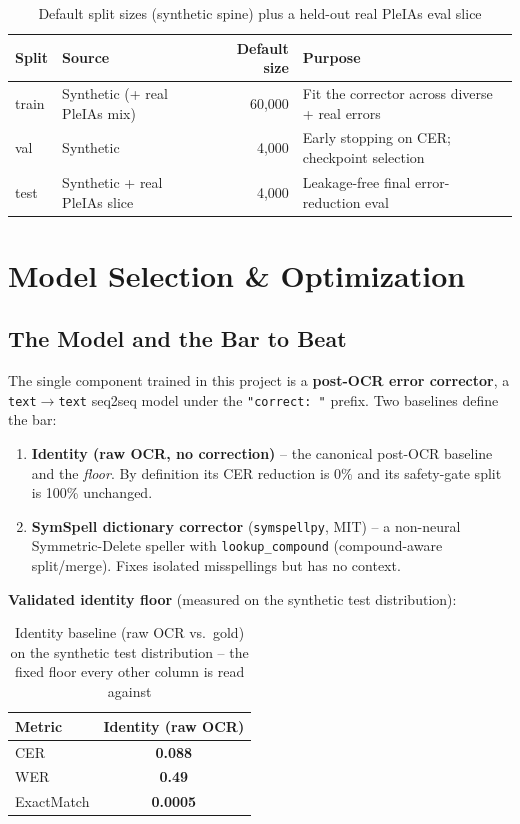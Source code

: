 \documentclass[12pt,a4paper]{article}
\begin{document}
\begin{table}[H]
\centering
\caption{Default split sizes (synthetic spine) plus a held-out real PleIAs eval slice}
\begin{tabular}{llrl}
\toprule
\textbf{Split} & \textbf{Source} & \textbf{Default size} & \textbf{Purpose} \\
\midrule
train & Synthetic (+ real PleIAs mix) & 60,000 & Fit the corrector across diverse + real errors \\
val   & Synthetic & 4,000 & Early stopping on CER; checkpoint selection \\
test  & Synthetic + real PleIAs slice & 4,000 & Leakage-free final error-reduction eval \\
\bottomrule
\end{tabular}
\end{table}

\section{Model Selection \& Optimization}

\subsection{The Model and the Bar to Beat}

The single component trained in this project is a \textbf{post-OCR error corrector}, a \texttt{text$\rightarrow$text} seq2seq model under the \texttt{"correct: "} prefix. Two baselines define the bar:
\begin{enumerate}
  \item \textbf{Identity (raw OCR, no correction)} -- the canonical post-OCR baseline and the \emph{floor}. By definition its CER reduction is 0\% and its safety-gate split is 100\% unchanged.
  \item \textbf{SymSpell dictionary corrector} (\texttt{symspellpy}, MIT) -- a non-neural Symmetric-Delete speller with \texttt{lookup\_compound} (compound-aware split/merge). Fixes isolated misspellings but has no context.
\end{enumerate}

\textbf{Validated identity floor} (measured on the synthetic test distribution):

\begin{table}[H]
\centering
\caption{Identity baseline (raw OCR vs.\ gold) on the synthetic test distribution -- the fixed floor every other column is read against}
\begin{tabular}{lc}
\toprule
\textbf{Metric} & \textbf{Identity (raw OCR)} \\
\midrule
CER & \textbf{0.088} \\
WER & \textbf{0.49} \\
ExactMatch & \textbf{0.0005} \\
\bottomrule
\end{tabular}
\end{table}
\end{document}
